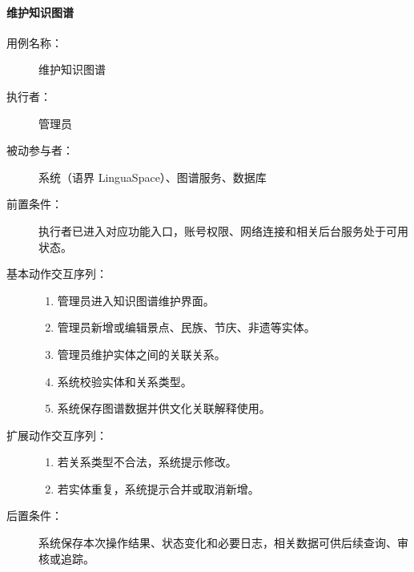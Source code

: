 \paragraph{维护知识图谱}
\begin{description}
  \item[用例名称：] 维护知识图谱
  \item[执行者：] 管理员
  \item[被动参与者：] 系统（语界 LinguaSpace）、图谱服务、数据库
  \item[前置条件：] 执行者已进入对应功能入口，账号权限、网络连接和相关后台服务处于可用状态。
  \item[基本动作交互序列：]
  \begin{enumerate}
    \item 管理员进入知识图谱维护界面。
    \item 管理员新增或编辑景点、民族、节庆、非遗等实体。
    \item 管理员维护实体之间的关联关系。
    \item 系统校验实体和关系类型。
    \item 系统保存图谱数据并供文化关联解释使用。
  \end{enumerate}
  \item[扩展动作交互序列：]
  \begin{enumerate}
    \item[4a.] 若关系类型不合法，系统提示修改。
    \item[4b.] 若实体重复，系统提示合并或取消新增。
  \end{enumerate}
  \item[后置条件：] 系统保存本次操作结果、状态变化和必要日志，相关数据可供后续查询、审核或追踪。
\end{description}

